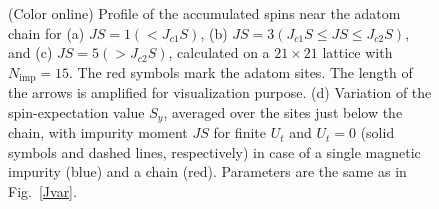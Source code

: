 \documentclass[aps,prl,reprint,nobibnotes]{revtex4-1}
\begin{document}
\begin{figure}[t]
\begin{center}
\vspace{-2em}
\caption{(Color online) Profile of the accumulated spins near the adatom chain for (a) $JS=1 (<J_{c1}S)$, (b) $JS=3 (J_{c1}S \leq JS \leq J_{c2}S)$, and (c) $JS=5 (>J_{c2}S)$, calculated on a $21 \times 21$ lattice with $N_{\text{imp}}=15$. The red symbols mark the adatom sites. The length of the arrows is amplified for visualization purpose. (d) Variation of the spin-expectation value $S_y$, averaged over the sites just below the chain, with impurity moment $JS$ for finite $U_t$ and $U_t=0$ (solid symbols and dashed lines, respectively) in case of a single magnetic impurity (blue) and a chain (red). Parameters are the same as in Fig.~\ref{Jvar}.} 
\label{texture}
\end{center}
\end{figure}
\end{document}
